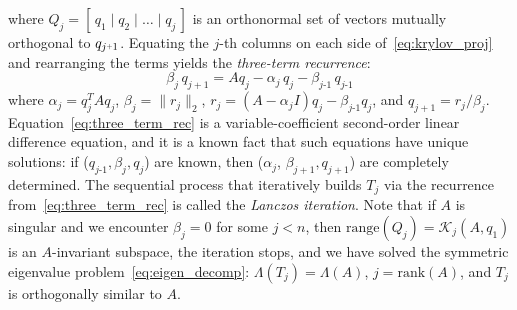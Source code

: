 \documentclass[10pt]{article}
\numberwithin{equation}{section}
\newcommand{\+}{%
	\raisebox{0.18ex}{\scaleobj{0.55}{+}}
}
\theoremstyle{definition}
\theoremstyle{definition}
\begin{document}
where $Q_j = [\, q_1 \mid q_2 \mid \dots \mid q_j \,]$ is an orthonormal set of vectors mutually orthogonal to $q_{j\+1}$.
Equating the $j$-th columns on each side of~\eqref{eq:krylov_proj} and rearranging the terms yields the \emph{three-term recurrence}: 
\begin{equation}\label{eq:three_term_rec}
	 \beta_{j} \, q_{j+1} = A q_j - \alpha_j \, q_j - \beta_{j\text{-}1} \, q_{j\text{-}1}  
\end{equation}
where $\alpha_j = q_j^T A q_j$, $\beta_j = \lVert r_j \rVert_2$, $r_j = (A - \alpha_j I)q_j - \beta_{j\text{-}1} q_j$, and $q_{j+1} = r_j / \beta_j$. 
Equation~\eqref{eq:three_term_rec} is a variable-coefficient second-order linear difference equation, and it is a known fact that such equations have unique solutions: if ($q_{j\text{-}1}, \beta_j, q_j$) are known, then ($\alpha_j$, $\beta_{j+1}, q_{j+1}$) are completely determined. 
The sequential process that iteratively builds $T_j$ via the recurrence from~\eqref{eq:three_term_rec} is called the \emph{Lanczos iteration}. 
Note that if $A$ is singular and we encounter $\beta_j = 0$ for some $j < n$, then $\mathrm{range}(Q_j) = \mathcal{K}_j(A, q_1)$ is an $A$-invariant subspace, the iteration stops, and we have solved the symmetric eigenvalue problem~\eqref{eq:eigen_decomp}: $\Lambda(T_j) = \Lambda(A)$, $j = \mathrm{rank}(A)$, and $T_j$ is orthogonally similar to $A$. 
\end{document}
